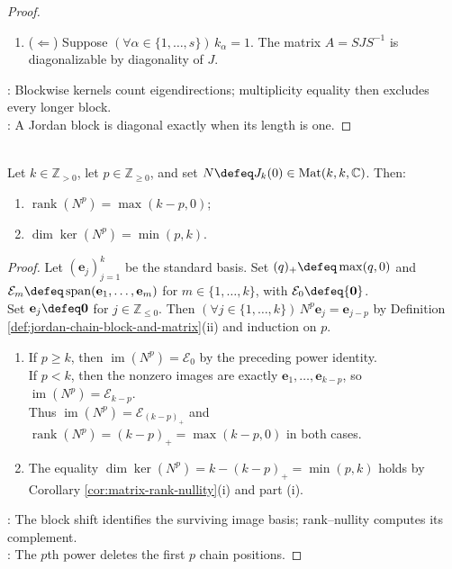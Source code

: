 \begin{corollary}
\begin{proof}
\begin{enumerate}[label=(\roman*)]
Fix $\alpha\in\{1,\ldots,s\}$ and set $\lambda\defeq\mu_{\alpha}$. Then $k_{\alpha}=1$ by $0=a_J(\lambda)-b_J(\lambda)=\sum\limits_{\beta=1}^{s}(k_{\beta}-1)\delta_{\lambda\beta}$ and nonnegativity of its summands.
\item[$(ii)$] ($\Leftarrow$) Suppose $(\forall\alpha\in\{1,\ldots,s\})\,k_{\alpha}=1$. The matrix $A=SJS^{-1}$ is diagonalizable by diagonality of $J$.
\end{enumerate}
: Blockwise kernels count eigendirections; multiplicity equality then excludes every longer block.\\
: A Jordan block is diagonal exactly when its length is one.
\end{proof}
\end{corollary}

\begin{lemma} \label{lem:nilpotent-jordan-block-power-rank} \\
Let $k\in\mathbb{Z}_{>0}$, let $p\in\mathbb{Z}_{\geq0}$, and set $N\defeq J_k(0)\in\operatorname{Mat}(k,k,\mathbb{C})$. Then:
\begin{enumerate}[label=(\roman*)]
\setlength{\itemsep}{0pt}
\item $\operatorname{rank}(N^p)=\max(k-p,0)$;
\item $\dim\ker(N^p)=\min(p,k)$.
\end{enumerate}
\begin{proof}
Let $(\mathbf{e}_j)_{j=1}^{k}$ be the standard basis. Set $(q)_+\defeq\max(q,0)$ and $\mathcal{E}_m\defeq\operatorname{span}(\mathbf{e}_1,\ldots,\mathbf{e}_m)$ for $m\in\{1,\ldots,k\}$, with $\mathcal{E}_0\defeq\{\mathbf{0}\}$.\\
Set $\mathbf{e}_j\defeq\mathbf{0}$ for $j\in\mathbb{Z}_{\leq0}$. Then $(\forall j\in\{1,\ldots,k\})\,N^p\mathbf{e}_j=\mathbf{e}_{j-p}$ by Definition \ref{def:jordan-chain-block-and-matrix}(ii) and induction on $p$.
\begin{enumerate}[label=(\roman*)]
\setlength{\itemsep}{0pt}
\item If $p\geq k$, then $\operatorname{im}(N^p)=\mathcal{E}_0$ by the preceding power identity.\\
If $p<k$, then the nonzero images are exactly $\mathbf{e}_1,\ldots,\mathbf{e}_{k-p}$, so $\operatorname{im}(N^p)=\mathcal{E}_{k-p}$.\\
Thus $\operatorname{im}(N^p)=\mathcal{E}_{(k-p)_+}$ and $\operatorname{rank}(N^p)=(k-p)_+=\max(k-p,0)$ in both cases.
\item The equality $\dim\ker(N^p)=k-(k-p)_+=\min(p,k)$ holds by Corollary \ref{cor:matrix-rank-nullity}(i) and part (i).
\end{enumerate}
: The block shift identifies the surviving image basis; rank--nullity computes its complement.\\
: The $p$th power deletes the first $p$ chain positions.
\end{proof}
\end{lemma}

